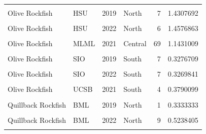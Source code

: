\documentclass[
]{article}
\begin{document}
\begin{longtable}[t]{llrlrr}
\cellcolor{gray!6}{Olive Rockfish} & \cellcolor{gray!6}{Cal Poly} & \cellcolor{gray!6}{2022} & \cellcolor{gray!6}{Central} & \cellcolor{gray!6}{38} & \cellcolor{gray!6}{0.7772227}\\
Olive Rockfish & HSU & 2019 & North & 7 & 1.4307692\\
\addlinespace
\cellcolor{gray!6}{Olive Rockfish} & \cellcolor{gray!6}{HSU} & \cellcolor{gray!6}{2021} & \cellcolor{gray!6}{North} & \cellcolor{gray!6}{14} & \cellcolor{gray!6}{2.1862810}\\
Olive Rockfish & HSU & 2022 & North & 6 & 1.4576863\\
\cellcolor{gray!6}{Olive Rockfish} & \cellcolor{gray!6}{MLML} & \cellcolor{gray!6}{2019} & \cellcolor{gray!6}{Central} & \cellcolor{gray!6}{127} & \cellcolor{gray!6}{1.1693979}\\
Olive Rockfish & MLML & 2021 & Central & 69 & 1.1431009\\
\cellcolor{gray!6}{Olive Rockfish} & \cellcolor{gray!6}{MLML} & \cellcolor{gray!6}{2022} & \cellcolor{gray!6}{Central} & \cellcolor{gray!6}{54} & \cellcolor{gray!6}{0.8360266}\\
\addlinespace
Olive Rockfish & SIO & 2019 & South & 7 & 0.3276709\\
\cellcolor{gray!6}{Olive Rockfish} & \cellcolor{gray!6}{SIO} & \cellcolor{gray!6}{2021} & \cellcolor{gray!6}{South} & \cellcolor{gray!6}{5} & \cellcolor{gray!6}{0.9801865}\\
Olive Rockfish & SIO & 2022 & South & 7 & 0.3269841\\
\cellcolor{gray!6}{Olive Rockfish} & \cellcolor{gray!6}{UCSB} & \cellcolor{gray!6}{2019} & \cellcolor{gray!6}{South} & \cellcolor{gray!6}{6} & \cellcolor{gray!6}{0.3348873}\\
Olive Rockfish & UCSB & 2021 & South & 4 & 0.3790099\\
\addlinespace
\cellcolor{gray!6}{Olive Rockfish} & \cellcolor{gray!6}{UCSB} & \cellcolor{gray!6}{2022} & \cellcolor{gray!6}{South} & \cellcolor{gray!6}{7} & \cellcolor{gray!6}{0.4618881}\\
Quillback Rockfish & BML & 2019 & North & 1 & 0.3333333\\
\cellcolor{gray!6}{Quillback Rockfish} & \cellcolor{gray!6}{BML} & \cellcolor{gray!6}{2021} & \cellcolor{gray!6}{North} & \cellcolor{gray!6}{5} & \cellcolor{gray!6}{0.7678571}\\
Quillback Rockfish & BML & 2022 & North & 9 & 0.5238405\\
\cellcolor{gray!6}{Quillback Rockfish} & \cellcolor{gray!6}{HSU} & \cellcolor{gray!6}{2019} & \cellcolor{gray!6}{North} & \cellcolor{gray!6}{22} & \cellcolor{gray!6}{1.3763665}\\

\end{longtable}
\end{document}
